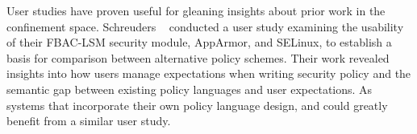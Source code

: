User studies have proven useful for gleaning insights about prior work in the
confinement space. Schreuders \etal~\cite{schreuders2012_towards} conducted a user study
examining the usability of their FBAC-LSM security module, AppArmor, and SELinux, to
establish a basis for comparison between alternative policy schemes. Their work revealed
insights into how users manage expectations when writing security policy and the semantic
gap between existing policy languages and user expectations. As systems that incorporate
their own policy language design, \bpfbox{} and \bpfcontain{} could greatly benefit from
a similar user study.


